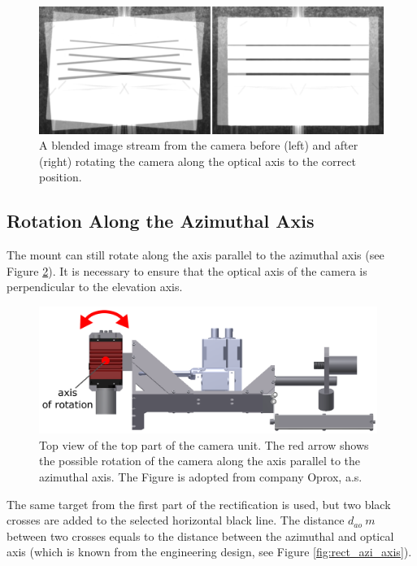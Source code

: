 \begin{figure}[htb]
	\centering
	\includegraphics[width=12cm]{fig/rect_mirrored_stream.png}
	\caption{A blended image stream from the camera before (left) and after (right) rotating the camera along the optical axis to the correct position.}
	\label{fig:rect_mirrored_stream}
\end{figure}

\subsection{Rotation Along the Azimuthal Axis}

The mount can still rotate along the axis parallel to the azimuthal axis (see Figure \ref{fig:rect_model_top_view}). It is necessary to ensure that the optical axis of the camera is perpendicular to the elevation axis. 

\begin{figure}[htb]
	\centering
	\includegraphics[width=11cm]{fig/rect_model_top_view.png}
	\caption{Top view of the top part of the camera unit. The red arrow shows the possible rotation of the camera along the axis parallel to the azimuthal axis. The Figure is adopted from company Oprox, a.s.}
	\label{fig:rect_model_top_view}
\end{figure}

The same target from the first part of the rectification is used, but two black crosses are added to the selected horizontal black line. The distance $d_{ao}\ m$ between two crosses equals to the distance between the azimuthal and optical axis (which is known from the engineering design, see Figure \ref{fig:rect_azi_axis}). 


